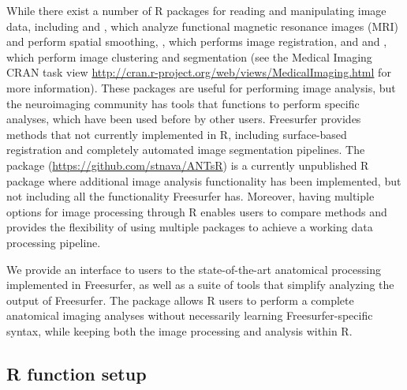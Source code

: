 While there exist a number of R packages for reading and manipulating
image data, including 
\citep{bordier_temporal_2011} and 
\citep{tabelow_statistical_2011}, which analyze functional magnetic
resonance images (MRI) and perform spatial smoothing,
\citep{modat_rniftyreg:_2013}, which performs image registration, and
 \citep{dpmixsim} and  \citep{mritc},
which perform image clustering and segmentation (see the Medical Imaging
CRAN task view
\url{http://cran.r-project.org/web/views/MedicalImaging.html} for more
information). These packages are useful for performing image analysis,
but the neuroimaging community has tools that functions to perform
specific analyses, which have been used before by other users.
Freesurfer provides methods that not currently implemented in R,
including surface-based registration and completely automated image
segmentation pipelines. The  package
(\url{https://github.com/stnava/ANTsR}) is a currently unpublished R
package where additional image analysis functionality has been
implemented, but not including all the functionality Freesurfer has.
Moreover, having multiple options for image processing through R enables
users to compare methods and provides the flexibility of using multiple
packages to achieve a working data processing pipeline.

We provide an interface to users to the state-of-the-art anatomical
processing implemented in Freesurfer, as well as a suite of tools that
simplify analyzing the output of Freesurfer. The 
package allows R users to perform a complete anatomical imaging analyses
without necessarily learning Freesurfer-specific syntax, while keeping
both the image processing and analysis within R.

\subsection{R function setup}\label{r-function-setup}

